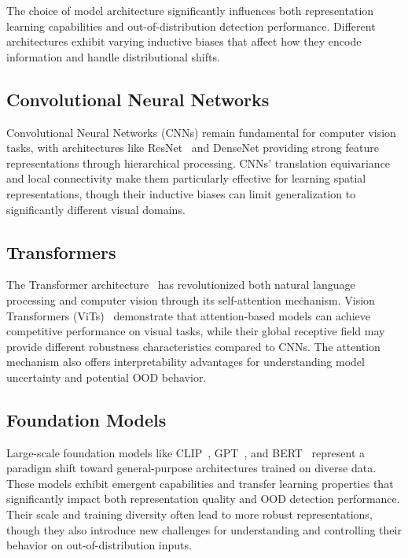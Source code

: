 \documentclass[11pt, oneside]{book}
\theoremstyle{plain}
\theoremstyle{definition}
\theoremstyle{remark}
\begin{document}
The choice of model architecture significantly influences both representation learning capabilities and out-of-distribution detection performance. Different architectures exhibit varying inductive biases that affect how they encode information and handle distributional shifts.

\subsection{Convolutional Neural Networks}

Convolutional Neural Networks (CNNs) remain fundamental for computer vision tasks, with architectures like ResNet~\citep{he2016deep} and DenseNet providing strong feature representations through hierarchical processing. CNNs' translation equivariance and local connectivity make them particularly effective for learning spatial representations, though their inductive biases can limit generalization to significantly different visual domains.

\subsection{Transformers}

The Transformer architecture~\citep{vaswani2017attention} has revolutionized both natural language processing and computer vision through its self-attention mechanism. Vision Transformers (ViTs)~\citep{dosovitskiy2020image} demonstrate that attention-based models can achieve competitive performance on visual tasks, while their global receptive field may provide different robustness characteristics compared to CNNs. The attention mechanism also offers interpretability advantages for understanding model uncertainty and potential OOD behavior.

\subsection{Foundation Models}

Large-scale foundation models like CLIP~\citep{radford2021learning}, GPT~\citep{brown2020language}, and BERT~\citep{devlin2018bert} represent a paradigm shift toward general-purpose architectures trained on diverse data. These models exhibit emergent capabilities and transfer learning properties that significantly impact both representation quality and OOD detection performance. Their scale and training diversity often lead to more robust representations, though they also introduce new challenges for understanding and controlling their behavior on out-of-distribution inputs.
\end{document}
